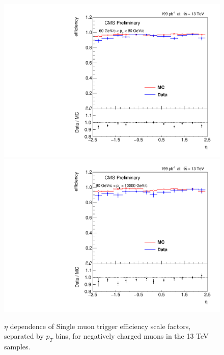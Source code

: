 \begin{figure}
\includegraphics[width=0.45\linewidth]{plots/efficiency/13_zmmhlt_negative/PtBins_eta_pt10.pdf}
\includegraphics[width=0.45\linewidth]{plots/efficiency/13_zmmhlt_negative/PtBins_eta_pt11.pdf}
\caption{$\eta$ dependence of Single muon trigger efficiency scale factors, separated by $p_T$ bins, for negatively charged muons in the 13 TeV samples.}
\label{fig:Eff:mu:13:HLT:neg}
\end{figure}
